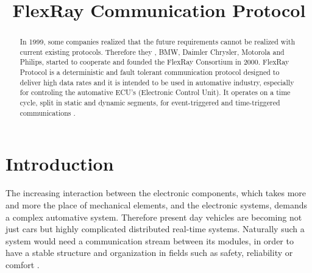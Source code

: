 \documentclass[conference]{IEEEtran}
\begin{document}
\title{FlexRay Communication Protocol\\
}

\author{
\and
{}

}

\maketitle

\begin{abstract}
In 1999, some companies realized that the future requirements cannot be realized with current existing protocols. Therefore they , BMW, Daimler Chrysler, Motorola and Philips, started to cooperate and founded the FlexRay Consortium in 2000\cite{reichart2005flexray}. FlexRay Protocol is a deterministic and fault tolerant communication protocol designed to deliver high data rates and it is intended to be used in automative industry, especially for controling the automative ECU's (Electronic Control Unit). It operates on a time cycle, split in static and dynamic segments, for event-triggered and time-triggered communications \cite{vaz2020efficient}.
\end{abstract}

\begin{IEEEkeywords}

\end{IEEEkeywords}

\section{Introduction}
The increasing interaction between the electronic components, which takes more and more the place of mechanical elements, and the electronic systems, demands a complex automative system. Therefore present day vehicles are becoming not just cars but highly complicated distributed real-time systems. Naturally such a system would need a communication stream between its modules, in order to have a stable structure and organization in fields such as safety, reliability or comfort \cite{steinbach2010comparing}.
\end{document}
